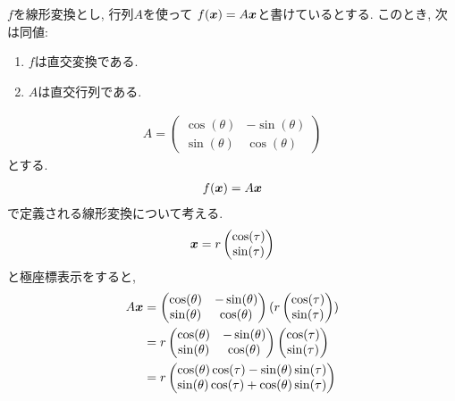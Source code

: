 \begin{remark}
  \Provelater
  $f$を線形変換とし, 行列$A$を使って
  $f(\boldsymbol{x})=A\boldsymbol{x}$と書けているとする.
  このとき, 次は同値:
  \begin{enumerate}
  \item $f$は直交変換である.
  \item $A$は直交行列である.
  \end{enumerate}
\end{remark}

\begin{example}
  \label{ex:rotation}
  \begin{align*}
    A=\begin{pmatrix}\cos(\theta)&-\sin(\theta)\\\sin(\theta)&\cos(\theta)\end{pmatrix}
  \end{align*}
  とする.
  \begin{align*}
    f(\boldsymbol{x})=A\boldsymbol{x}
  \end{align*}
  で定義される線形変換について考える.
  \begin{align*}
    \boldsymbol{x}=r\begin{pmatrix}\cos(\tau)\\\sin(\tau)\end{pmatrix}
  \end{align*}
  と極座標表示をすると,
  \begin{align*}
    A\xx
    &=
    \begin{pmatrix}\cos(\theta)&-\sin(\theta)\\\sin(\theta)&\cos(\theta)\end{pmatrix}
    (r\begin{pmatrix}\cos(\tau)\\\sin(\tau)\end{pmatrix})\\
    &=
    r\begin{pmatrix}\cos(\theta)&-\sin(\theta)\\\sin(\theta)&\cos(\theta)\end{pmatrix}
    \begin{pmatrix}\cos(\tau)\\\sin(\tau)\end{pmatrix}\\
    &=
    r\begin{pmatrix}\cos(\theta)\cos(\tau)-\sin(\theta)\sin(\tau)\\\sin(\theta)\cos(\tau)+\cos(\theta)\sin(\tau)\end{pmatrix}\\

\end{align*}
\end{example}
